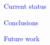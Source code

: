 \documentclass{slides}
\newcommand{\ti}[1]{\begin{center}\Large{\textcolor{blue}{#1}}\end{center}}
\begin{document}
\begin{slide}\ti{Current status}
\vfill\end{slide}
\begin{slide}\ti{Conclusions}

\vfill\end{slide}
\begin{slide}\ti{Future work}

\vfill\end{slide}



\end{document}
